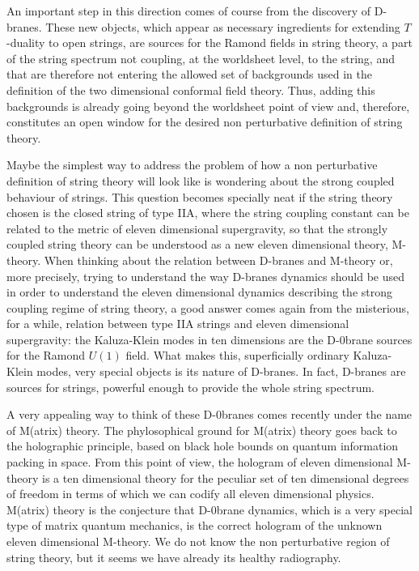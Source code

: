 An important step in this direction comes of course from the
discovery of D-branes. These new objects, which appear as
necessary ingredients for extending $T$-duality to open strings,
are sources for the Ramond fields in string theory, a part of the
string spectrum not coupling, at the worldsheet level, to the
string, and that are therefore not entering the allowed set of
backgrounds used in the definition of the two dimensional
conformal field theory. Thus, adding this backgrounds is already
going beyond the worldsheet point of view and, therefore,
constitutes an open window for the desired non perturbative
definition of string theory.
  
Maybe the simplest way to address the problem of how a non
perturbative definition of string theory will look like is
wondering about the strong coupled behaviour of strings. This
question becomes specially neat if the string theory chosen is 
the closed string of type IIA, where the string
coupling constant can be related to the metric of eleven dimensional
supergravity, so that the strongly coupled string
theory can be understood as a new eleven dimensional theory,
M-theory. When thinking about the relation between D-branes and
M-theory or, more precisely, trying to understand the way
D-branes dynamics should be used in order to understand the
eleven dimensional dynamics describing the strong coupling regime
of string theory, a good answer comes again from the misterious,
for a while, relation between type IIA strings and
eleven dimensional supergravity: the Kaluza-Klein modes in ten
dimensions are the D-$0$brane sources for the Ramond $U(1)$
field. What makes this, superficially ordinary Kaluza-Klein
modes, very special objects is its nature of D-branes. In fact,
D-branes are sources for strings, powerful enough to provide the
whole string spectrum.
  
A very appealing way to think of these D-$0$branes comes recently
under the name of M(atrix) theory. The phylosophical ground for
M(atrix) theory goes back to the holographic principle, based on
black hole bounds on quantum information packing in space. From
this point of view, the hologram of eleven dimensional M-theory
is a ten dimensional theory for the peculiar set of ten
dimensional degrees of freedom in terms of which we can codify
all eleven dimensional physics. M(atrix) theory is the conjecture
that D-$0$brane dynamics, which is a very special type of matrix quantum
mechanics, is the correct hologram of the unknown eleven
dimensional M-theory. We do not know the non perturbative region
of string theory, but it seems we have already its healthy
radiography.
  
